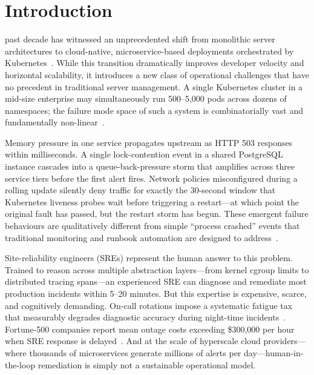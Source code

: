 \documentclass[journal,10pt,twoside]{IEEEtran}
\begin{document}
\section{Introduction}\label{sec:intro}

 past decade has witnessed an unprecedented shift from
monolithic server architectures to cloud-native, microservice-based
deployments orchestrated by Kubernetes~\cite{burns2016borg}. While this
transition dramatically improves developer velocity and horizontal
scalability, it introduces a new class of operational challenges that
have no precedent in traditional server management. A single Kubernetes
cluster in a mid-size enterprise may simultaneously run 500--5{,}000
pods across dozens of namespaces; the failure mode space of such a system
is combinatorially vast and fundamentally non-linear~\cite{ford2010availability}.

Memory pressure in one service propagates upstream as HTTP 503 responses
within milliseconds. A single lock-contention event in a shared PostgreSQL
instance cascades into a queue-back-pressure storm that amplifies across
three service tiers before the first alert fires. Network policies misconfigured
during a rolling update silently deny traffic for exactly the 30-second window
that Kubernetes liveness probes wait before triggering a restart---at which
point the original fault has passed, but the restart storm has begun. These
emergent failure behaviours are qualitatively different from simple
``process crashed'' events that traditional monitoring and runbook
automation are designed to address~\cite{ibidunmoye2015performance}.

Site-reliability engineers (SREs) represent the human answer to this
problem. Trained to reason across multiple abstraction layers---from
kernel cgroup limits to distributed tracing spans---an experienced SRE
can diagnose and remediate most production incidents within 5--20
minutes. But this expertise is expensive, scarce, and cognitively
demanding. On-call rotations impose a systematic fatigue tax that measurably
degrades diagnostic accuracy during night-time incidents~\cite{weng2022oncall}.
Fortune-500 companies report mean outage costs exceeding \$300{,}000 per
hour when SRE response is delayed~\cite{iqbal2023cost}. And at the
scale of hyperscale cloud providers---where thousands of microservices
generate millions of alerts per day---human-in-the-loop remediation is
simply not a sustainable operational model.
\end{document}
